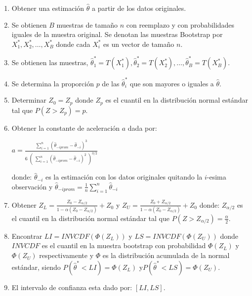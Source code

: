 \begin{enumerate}
 \item Obtener una estimación $\hat{\theta}$ a partir de los datos originales.
 
\item Se obtienen $B$ muestras de tamaño $n$ con reemplazo y con probabilidades iguales de la muestra original. Se denotan las muestras Bootstrap por $X^{*}_{1}, X^{*}_{2},  \dots, X^{*}_{B}$ donde cada $X^{*}_{i}$ es un vector de tamaño $n$.

\item Se obtienen las muestras, $\hat{\theta}^{*}_{1} = T (X^{*}_{1}) , \hat{\theta}^{*}_{2} = T (X^{*}_{2}), \dots,\hat{\theta}^{*}_{B} = T (X^{*}_{B})$.

\item Se determina la proporción $p$ de las  $\hat{\theta}^{*}_{i}$ que son mayores o iguales a $\hat{\theta}$.

\item  Determinar $Z_{0} = Z_{p}$ donde $Z_{p}$ es el cuantil en la distribución normal estándar tal que $P(Z > Z_{p}) = p$.

\item  Obtener la constante de aceleración $a$ dada por:
\begin{center}
 \Large $ a = \frac{\sum_{i=1}^{n}  (\hat{\theta}_{-iprom}  - \hat{\theta}_{-i})^{3} }{ 6 \; (\; \sum_{i=1}^{n}  ( \hat{\theta}_{-iprom}  - \hat{\theta}_{-i})^{2} \; )^{3/2}} $
\end{center}

 donde: $\hat{\theta}_{-i}$ es la estimación con los datos originales quitando la $i$-esima observación y {\normalsize $\hat{\theta}_{-iprom} = \frac{1}{n} \sum_{i=1}^{n}\hat{\theta}_{-i}$}
 
 \item Obtener {\large $Z_{L} = \frac{Z_{0} - Z_{\alpha/2}}{ 1- \alpha ( Z_{0} - Z_{\alpha/2})} + Z_{0}  $}   y {\large $Z_{U} = \frac{Z_{0} + Z_{\alpha/2}}{ 1- \alpha ( Z_{0} - Z_{\alpha/2})} + Z_{0}  $}  donde: $Z_{\alpha /2}$ es el cuantil en la
 distribución normal estándar tal que $P(Z > Z_{\alpha / 2}) = \frac{\alpha}{2}$.
 
 
 \item Encontrar $LI = INVCDF( \Phi(Z_{L}))$ y $LS = INVCDF( \Phi(Z_{U}))$ donde $INVCDF$ es el cuantil en la muestra bootstrap con probabilidad $ \Phi(Z_{L})$ y $ \Phi(Z_{U})$ respectivamente y $\Phi$ es la distribución acumulada de la normal estándar, siendo $P(\hat{\theta}^{*} < LI) = \Phi(Z_{L})$ y$P(\hat{\theta}^{*} < LS) = \Phi(Z_{U})$.
 
\item El intervalo de confianza esta dado por: $[LI, LS]$.
\end{enumerate}





















